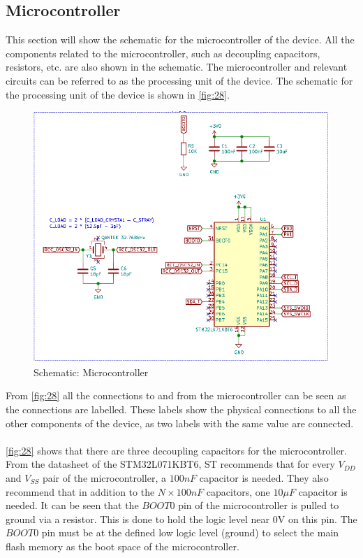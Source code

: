 \subsection{Microcontroller}
This section will show the schematic for the microcontroller of the device. All the components related to the microcontroller, such as decoupling capacitors, resistors, etc. are also shown in the schematic. The microcontroller and relevant circuits can be referred to as the processing unit of the device. The schematic for the processing unit of the device is shown in \autoref{fig:28}. 
\begin{figure}[H]
	\centering
	\includegraphics[scale=0.6]{img/Schematic_MCU}
	\caption{Schematic: Microcontroller}
	\label{fig:28}
\end{figure}
\noindent
From \autoref{fig:28} all the connections to and from the microcontroller can be seen as the connections are labelled. These labels show the physical connections to all the other components of the device, as two labels with the same value are connected.  
\\
\\
\autoref{fig:28} shows that there are three decoupling capacitors for the microcontroller. From the datasheet of the STM32L071KBT6, ST recommends that for every $ V_{DD} $ and $ V_{SS} $ pair of the microcontroller, a $ 100 nF $ capacitor is needed. They also recommend that in addition to the $ N \times 100 nF $ capacitors, one $ 10 \mu F $ capacitor is needed. It can be seen that the $ BOOT0 $ pin of the microcontroller is pulled to ground via a resistor. This is done to hold the logic level near 0V on this pin. The $ BOOT0 $ pin must be at the defined low logic level (ground) to select the main flash memory as the boot space of the microcontroller. 
